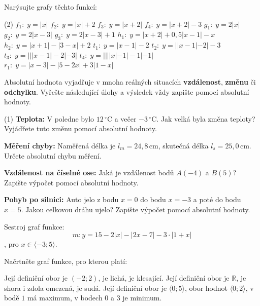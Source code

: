 \documentclass[12pt,a4paper]{article}
\begin{document}
\begin{exercise}
    Narýsujte grafy těchto funkcí:
    \begin{tasks}(2)
        \task $f_1: \; y=|x|$
        \task $f_2: \; y=|x|+2$
        \task $f_3: \; y=|x+2|$
        \task $f_4: \; y=|x+2|-3$
        \task $g_1: \; y=2|x|$
        \task $g_2: \; y=2|x-3|$
        \task $g_3: \; y=2|x-3|+1$
        \task $h_1: \; y=|x+2| + 0{,}5|x-1| - x$
        \task $h_2: \; y=|x+1| - |3-x| + 2$
        \task $t_1: \; y=|x-1| - 2$
        \task $t_2: \; y=||x-1|-2| - 3$
        \task $t_3: \; y=|||x-1|-2|-3|$
        \task $t_4: \; y=||||x|-1|-1|-1|$
        \task $r_1: \; y=|x-3| - |5-2x| + 3|1-x|$
    \end{tasks}
\end{exercise}


\begin{exercise}
    Absolutní hodnota vyjadřuje v mnoha reálných situacích \textbf{vzdálenost}, \textbf{změnu} či \textbf{odchylku}.  
    Vyřešte následující úlohy a výsledek vždy zapište pomocí absolutní hodnoty.

    \begin{tasks}(1)
        \task \textbf{Teplota:}  
        V poledne bylo $12\,^\circ\mathrm{C}$ a večer $-3\,^\circ\mathrm{C}$.  
        Jak velká byla změna teploty? Vyjádřete tuto změnu pomocí absolutní hodnoty.

        \task \textbf{Měření chyby:}  
        Naměřená délka je $l_m = 24{,}8\,\mathrm{cm}$, skutečná délka $l_s = 25{,}0\,\mathrm{cm}$.  
        Určete absolutní chybu měření.

        \task \textbf{Vzdálenost na číselné ose:}  
        Jaká je vzdálenost bodů $A(-4)$ a $B(5)$?  
        Zapište výpočet pomocí absolutní hodnoty.

        \task \textbf{Pohyb po silnici:}  
        Auto jelo z bodu $x=0$ do bodu $x=-3$ a poté do bodu $x=5$.  
        Jakou celkovou dráhu ujelo? Zapište výpočet pomocí absolutní hodnoty.
    \end{tasks}
\end{exercise}


\begin{exercise}
    Sestroj graf funkce: 
    \[
    m: y= 15 -2|x| - |2x-7| - 3\cdot |1+x|
    \]
    , pro $x\in \langle -3;5\rangle$. 
\end{exercise}


\begin{exercise}
    Načrtněte graf funkce, pro kterou platí:
    \begin{tasks}
        \task Její definiční obor je $(-2;2)$, je lichá, je klesající.
        \task Její definiční obor je $\mathbb{R}$, je shora i zdola omezená, je sudá.
        \task Její definiční obor je $\langle0;5\rangle$, obor hodnot $\langle0;2\rangle$, v bodě $1$ má maximum, v bodech $0$ a $3$ je minimum.
    \end{tasks}
\end{exercise}
\end{document}
